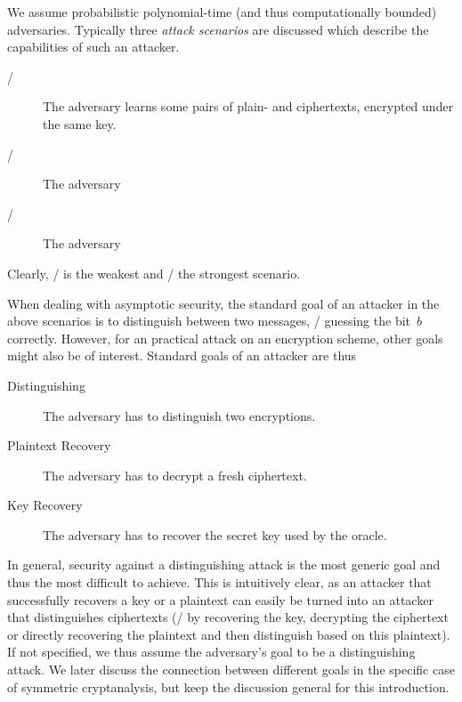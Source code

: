 We assume probabilistic polynomial-time (and thus computationally bounded) adversaries.
Typically three \emph{attack scenarios} are discussed which describe the capabilities of such an attacker.
\begin{description}
    \item[\KPA/] The adversary learns some pairs of plain- and ciphertexts, encrypted under the same key.
    \item[\CPA/] The adversary 
    \item[\CCA/] The adversary 
\end{description}
Clearly, \KPA/ is the weakest and \CCA/ the strongest scenario.

When dealing with asymptotic security, the standard goal of an attacker in the above scenarios is to distinguish between two messages, \ie/ guessing the bit~$b$ correctly.
However, for an practical attack on an encryption scheme, other goals might also be of interest.
Standard goals of an attacker are thus
\begin{description}
    \item[Distinguishing] The adversary has to distinguish two encryptions.
    \item[Plaintext Recovery] The adversary has to decrypt a fresh ciphertext.
    \item[Key Recovery] The adversary has to recover the secret key used by the oracle.
\end{description}
In general, security against a distinguishing attack is the most generic goal and thus the most difficult to achieve.
This is intuitively clear, as an attacker that successfully recovers a key or a plaintext can easily be turned into an attacker that distinguishes ciphertexts (\ie/ by recovering the key, decrypting the ciphertext or directly recovering the plaintext and then distinguish based on this plaintext).
If not specified, we thus assume the adversary's goal to be a distinguishing attack.
We later discuss the connection between different goals in the specific case of symmetric cryptanalysis, but keep the discussion general for this introduction.

